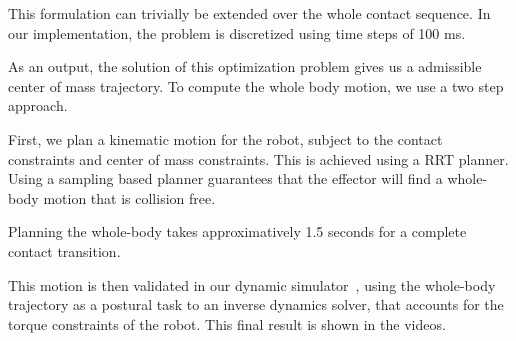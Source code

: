 This formulation can trivially be extended over the whole contact sequence.
In our implementation, the problem is discretized using time steps of 100 ms. 

As an output, the solution of this optimization problem gives us a admissible center of mass trajectory.
To compute the whole body motion, we use a two step approach.

First, we plan a kinematic motion for the robot, subject to the contact constraints and center of mass constraints.
This is achieved using a RRT planner. Using a sampling based planner guarantees that the effector will find a whole-body motion that is collision free.

Planning the whole-body takes approximatively 1.5 seconds for a complete contact transition.

This motion is then validated in our dynamic simulator~\citep{DelPrete2015b}, using the whole-body trajectory as a postural task to an inverse dynamics
solver, that accounts for the torque constraints of the robot. This final result is shown in the videos.
